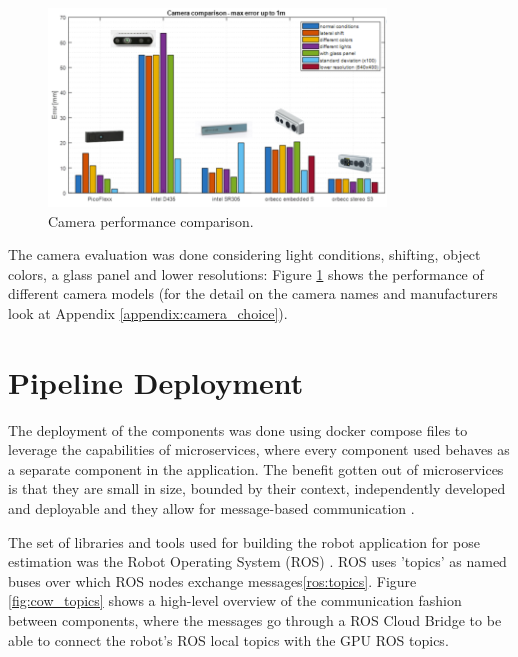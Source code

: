     \begin{figure}[h]
        \centering
        \includegraphics[width=0.8\textwidth]{images/camera_choice.png}
        \caption{Camera performance comparison.}
        \label{fig:camera_choice}
    \end{figure}
    
    The camera evaluation was done considering light conditions, shifting, object colors, a glass panel and lower resolutions: Figure \ref{fig:camera_choice} shows the performance of different camera models (for the detail on the camera names and manufacturers look at Appendix \ref{appendix:camera_choice}).
\section{Pipeline Deployment}
The deployment of the components was done using docker compose files to leverage the capabilities of microservices, where every component used behaves as a separate component in the application. The benefit gotten out of microservices is that they are small in size, bounded by their context, independently developed and deployable and they allow for message-based communication%
. 

The set of libraries and tools used for building the robot application for pose estimation was the Robot Operating System (ROS)%
. ROS uses 'topics' as named buses over which ROS nodes exchange messages\ref{ros:topics}. %
Figure \ref{fig:cow_topics} shows a high-level overview of the communication fashion between components, where the messages go through a ROS Cloud Bridge to be able to connect the robot's ROS local topics with the GPU ROS topics. 



